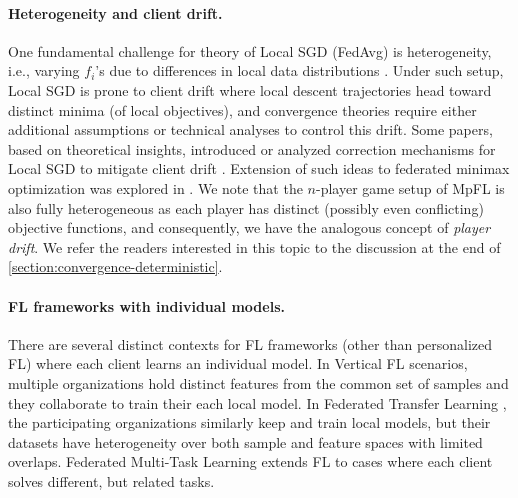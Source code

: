 \documentclass{article}
\theoremstyle{plain}
\theoremstyle{remark}
\begin{document}
\paragraph{Heterogeneity and client drift.}
One fundamental challenge for theory of Local SGD (FedAvg) is heterogeneity, i.e., varying $f_i$'s due to differences in local data distributions \citep{KonecnyMcMahanRamageRichtarik2016_federated, LiSahuZaheerSanjabiTalwalkarSmith2020_federated}.
Under such setup, Local SGD is prone to client drift \citep{ZhaoLiLaiSudaCivinChandra2018_federated, KarimireddyKaleMohriReddiStichSuresh2020_scaffold} where local descent trajectories head toward distinct minima (of local objectives), and convergence theories require either additional assumptions \citep{WangTuorSalonidisLeungMakayaHeChan2019_adaptive, YuYangZhu2019_parallel, HaddadpourMahdavi2019_convergence, LiSahuZaheerSanjabiTalwalkarSmith2020_federated} or technical analyses \citep{KhaledMishchenkoRichtarik2020_tighter, KoloskovaLoizouBoreiriJaggiStich2020_unified} to control this drift.
Some papers, based on theoretical insights, introduced or analyzed correction mechanisms for Local SGD to mitigate client drift \citep{KarimireddyKaleMohriReddiStichSuresh2020_scaffold, GorbunovHanzelyRichtarik2021_local, MitraJaafarPappasHassani2021_linear, MishchenkoMalinovskyStichRichtarik2022_proxskip, HuHuang2023_tighter, GrudzienMalinovskyRichtarik2023_can}.
Extension of such ideas to federated minimax optimization was explored in \citep{zhang2023communication}.
We note that the $n$-player game setup of MpFL is also fully heterogeneous as each player has distinct (possibly even conflicting) objective functions, and consequently, we have the analogous concept of \emph{player drift}.
We refer the readers interested in this topic to the discussion at the end of \cref{section:convergence-deterministic}.

\paragraph{FL frameworks with individual models.}
There are several distinct contexts for FL frameworks (other than personalized FL) where each client learns an individual model.
In Vertical FL \citep{YangLiuChenTong2019_federated, LiuZhangKangLiChenHongYang2022_fedbcd,  LiuKangZouPuHeYeOuyangZhangYang2024_vertical} scenarios, multiple organizations hold distinct features from the common set of samples and they collaborate to train their each local model.
In Federated Transfer Learning \citep{SharmaXingLiuKang2019_secure, LiuKangXingChenYang2020_secure, FengLiYuLiuYang2022_semisupervised}, the participating organizations similarly keep and train local models, but their datasets have heterogeneity over both sample and feature spaces with limited overlaps.
Federated Multi-Task Learning \citep{SmithChiangSanjabiTalwalkar2017_federated, MarfoqNegliaBelletKameniVidal2021_federated, mills2021multi} extends FL to cases where each client solves different, but related tasks.
\end{document}
